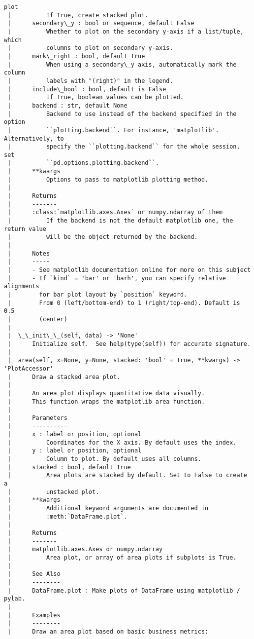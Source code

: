 \documentclass[11pt]{article}
\begin{document}
\begin{Verbatim}[commandchars=\\\{\}]
plot
 |          If True, create stacked plot.
 |      secondary\_y : bool or sequence, default False
 |          Whether to plot on the secondary y-axis if a list/tuple, which
 |          columns to plot on secondary y-axis.
 |      mark\_right : bool, default True
 |          When using a secondary\_y axis, automatically mark the column
 |          labels with "(right)" in the legend.
 |      include\_bool : bool, default is False
 |          If True, boolean values can be plotted.
 |      backend : str, default None
 |          Backend to use instead of the backend specified in the option
 |          ``plotting.backend``. For instance, 'matplotlib'. Alternatively, to
 |          specify the ``plotting.backend`` for the whole session, set
 |          ``pd.options.plotting.backend``.
 |      **kwargs
 |          Options to pass to matplotlib plotting method.
 |
 |      Returns
 |      -------
 |      :class:`matplotlib.axes.Axes` or numpy.ndarray of them
 |          If the backend is not the default matplotlib one, the return value
 |          will be the object returned by the backend.
 |
 |      Notes
 |      -----
 |      - See matplotlib documentation online for more on this subject
 |      - If `kind` = 'bar' or 'barh', you can specify relative alignments
 |        for bar plot layout by `position` keyword.
 |        From 0 (left/bottom-end) to 1 (right/top-end). Default is 0.5
 |        (center)
 |
 |  \_\_init\_\_(self, data) -> 'None'
 |      Initialize self.  See help(type(self)) for accurate signature.
 |
 |  area(self, x=None, y=None, stacked: 'bool' = True, **kwargs) ->
'PlotAccessor'
 |      Draw a stacked area plot.
 |
 |      An area plot displays quantitative data visually.
 |      This function wraps the matplotlib area function.
 |
 |      Parameters
 |      ----------
 |      x : label or position, optional
 |          Coordinates for the X axis. By default uses the index.
 |      y : label or position, optional
 |          Column to plot. By default uses all columns.
 |      stacked : bool, default True
 |          Area plots are stacked by default. Set to False to create a
 |          unstacked plot.
 |      **kwargs
 |          Additional keyword arguments are documented in
 |          :meth:`DataFrame.plot`.
 |
 |      Returns
 |      -------
 |      matplotlib.axes.Axes or numpy.ndarray
 |          Area plot, or array of area plots if subplots is True.
 |
 |      See Also
 |      --------
 |      DataFrame.plot : Make plots of DataFrame using matplotlib / pylab.
 |
 |      Examples
 |      --------
 |      Draw an area plot based on basic business metrics:

\end{Verbatim}
\end{document}
